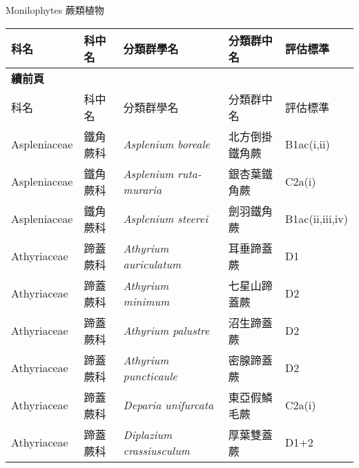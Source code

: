 \noindent\normalfont\selectfont Monilophytes 蕨類植物
\footnotesize\selectfont
        {\def\arraystretch{1.5}\tabcolsep=2pt
        \begin{longtable}{p{2.5cm}p{2.5cm}p{4.5cm}p{2.5cm}p{3cm}}
        \toprule
          科名 & 科中名 & 分類群學名 & 分類群中名 & 評估標準 \\
        \midrule 
        \endfirsthead

        {{\bfseries 續前頁 }} \\
        科名 & 科中名 & 分類群學名 & 分類群中名 & 評估標準 \\
        \midrule
        \endhead
                Aspleniaceae & 鐵角蕨科 & \textit{Asplenium boreale}  & 北方倒掛鐵角蕨 & B1ac(i,ii) \index{Asplenium@\textit{Asplenium}!boreale@\textit{boreale}}  \index{北方倒掛鐵角蕨} \\
    Aspleniaceae & 鐵角蕨科 & \textit{Asplenium ruta-muraria}  & 銀杏葉鐵角蕨 & C2a(i) \index{Asplenium@\textit{Asplenium}!ruta-muraria@\textit{ruta-muraria}}  \index{銀杏葉鐵角蕨} \\
    Aspleniaceae & 鐵角蕨科 & \textit{Asplenium steerei}  & 劍羽鐵角蕨 & B1ac(ii,iii,iv) \index{Asplenium@\textit{Asplenium}!steerei@\textit{steerei}}  \index{劍羽鐵角蕨} \\
    Athyriaceae & 蹄蓋蕨科 & \textit{Athyrium auriculatum}  & 耳垂蹄蓋蕨 & D1 \index{Athyrium@\textit{Athyrium}!auriculatum@\textit{auriculatum}}  \index{耳垂蹄蓋蕨} \\
    Athyriaceae & 蹄蓋蕨科 & \textit{Athyrium minimum}  & 七星山蹄蓋蕨 & D2 \index{Athyrium@\textit{Athyrium}!minimum@\textit{minimum}}  \index{七星山蹄蓋蕨} \\
    Athyriaceae & 蹄蓋蕨科 & \textit{Athyrium palustre}  & 沼生蹄蓋蕨 & D2 \index{Athyrium@\textit{Athyrium}!palustre@\textit{palustre}}  \index{沼生蹄蓋蕨} \\
    Athyriaceae & 蹄蓋蕨科 & \textit{Athyrium puncticaule}  & 密腺蹄蓋蕨 & D2 \index{Athyrium@\textit{Athyrium}!puncticaule@\textit{puncticaule}}  \index{密腺蹄蓋蕨} \\
    Athyriaceae & 蹄蓋蕨科 & \textit{Deparia unifurcata}  & 東亞假鱗毛蕨 & C2a(i) \index{Deparia@\textit{Deparia}!unifurcata@\textit{unifurcata}}  \index{東亞假鱗毛蕨} \\
    Athyriaceae & 蹄蓋蕨科 & \textit{Diplazium crassiusculum}  & 厚葉雙蓋蕨 & D1+2 \index{Diplazium@\textit{Diplazium}!crassiusculum@\textit{crassiusculum}}  \index{厚葉雙蓋蕨} \\

\end{longtable}}
